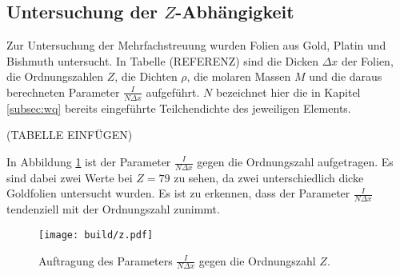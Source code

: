 \subsection{Untersuchung der $Z$-Abhängigkeit}
\label{subsec:z}

Zur Untersuchung der Mehrfachstreuung wurden Folien aus Gold, Platin und
Bishmuth untersucht. In Tabelle (REFERENZ) sind die Dicken $\Delta x$ der Folien,
die Ordnungszahlen $Z$, die Dichten $\rho$, die molaren Massen $M$ und die daraus berechneten
Parameter $\frac{I}{N \Delta x}$ aufgeführt. $N$ bezeichnet hier die in Kapitel \ref{subsec:wq}
bereits eingeführte Teilchendichte des jeweiligen Elements.

(TABELLE EINFÜGEN)

In Abbildung \ref{fig:z} ist der Parameter $\frac{I}{N \Delta x}$ gegen die Ordnungszahl
aufgetragen. Es sind dabei zwei Werte bei $Z=79$ zu sehen, da zwei unterschiedlich dicke
Goldfolien untersucht wurden. Es ist zu erkennen, dass der Parameter $\frac{I}{N \Delta x}$
tendenziell mit der Ordnungszahl zunimmt.

\begin{figure}
  \centering
  \texttt{[image: build/z.pdf]}
  \caption{Auftragung des Parameters $\frac{I}{N \Delta x}$ gegen die Ordnungszahl $Z$.}
  \label{fig:z}
\end{figure}
